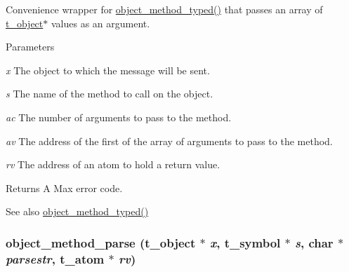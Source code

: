 Convenience wrapper for \hyperlink{group__obj_ga443dee482af22e0fe83e68955d367226}{object\_\-method\_\-typed()} that passes an array of \hyperlink{structt__object}{t\_\-object}$\ast$ values as an argument. 
\begin{DoxyParams}{Parameters}
\item[{\em x}]The object to which the message will be sent. \item[{\em s}]The name of the method to call on the object. \item[{\em ac}]The number of arguments to pass to the method. \item[{\em av}]The address of the first of the array of arguments to pass to the method. \item[{\em rv}]The address of an atom to hold a return value.\end{DoxyParams}
\begin{DoxyReturn}{Returns}
A Max error code. 
\end{DoxyReturn}
\begin{DoxySeeAlso}{See also}
\hyperlink{group__obj_ga443dee482af22e0fe83e68955d367226}{object\_\-method\_\-typed()} 
\end{DoxySeeAlso}
\hypertarget{group__obj_ga8c420370f84f178515540831cbe4e6d8}{
\subsubsection[{object\_\-method\_\-parse}]{ object\_\-method\_\-parse ({\bf t\_\-object} $\ast$ {\em x}, \/  {\bf t\_\-symbol} $\ast$ {\em s}, \/  char $\ast$ {\em parsestr}, \/  {\bf t\_\-atom} $\ast$ {\em rv})}}
\label{group__obj_ga8c420370f84f178515540831cbe4e6d8}


